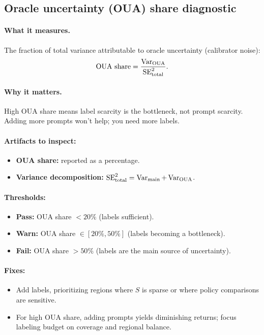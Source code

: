 \subsection{Oracle uncertainty (OUA) share diagnostic}

\paragraph{What it measures.} The fraction of total variance attributable to oracle uncertainty (calibrator noise):
\begin{equation}
\text{OUA share} = \frac{\operatorname{Var}_{\text{OUA}}}{\operatorname{SE}^2_{\text{total}}}.
\end{equation}

\paragraph{Why it matters.} High OUA share means label scarcity is the bottleneck, not prompt scarcity. Adding more prompts won't help; you need more labels.

\paragraph{Artifacts to inspect:}
\begin{itemize}
\item \textbf{OUA share:} reported as a percentage.
\item \textbf{Variance decomposition:} $\operatorname{SE}^2_{\text{total}} = \operatorname{Var}_{\text{main}} + \operatorname{Var}_{\text{OUA}}$.
\end{itemize}

\paragraph{Thresholds:}
\begin{itemize}
\item \textbf{Pass:} OUA share $< 20\%$ (labels sufficient).
\item \textbf{Warn:} OUA share $\in [20\%, 50\%]$ (labels becoming a bottleneck).
\item \textbf{Fail:} OUA share $> 50\%$ (labels are the main source of uncertainty).
\end{itemize}

\paragraph{Fixes:}
\begin{itemize}
\item Add labels, prioritizing regions where $S$ is sparse or where policy comparisons are sensitive.
\item For high OUA share, adding prompts yields diminishing returns; focus labeling budget on coverage and regional balance.
\end{itemize}

